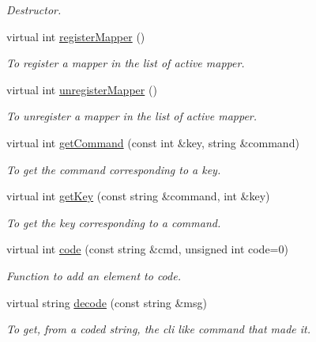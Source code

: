 \begin{DoxyCompactItemize}
\begin{DoxyCompactList}\small\item\em Destructor. \item\end{DoxyCompactList}\item 
virtual int \hyperlink{classUMSMapper_a39acbc8e93c31d005a3a676ce9ec5e4c}{registerMapper} ()
\begin{DoxyCompactList}\small\item\em To register a mapper in the list of active mapper. \item\end{DoxyCompactList}\item 
virtual int \hyperlink{classUMSMapper_ae825ecd7039b09d7ddd74be5e2236628}{unregisterMapper} ()
\begin{DoxyCompactList}\small\item\em To unregister a mapper in the list of active mapper. \item\end{DoxyCompactList}\item 
virtual int \hyperlink{classUMSMapper_abf93114fd8a822d7d1b342686e2d32f9}{getCommand} (const int \&key, string \&command)
\begin{DoxyCompactList}\small\item\em To get the command corresponding to a key. \item\end{DoxyCompactList}\item 
virtual int \hyperlink{classUMSMapper_a1a8e2189e1770c426387e391dc75dce9}{getKey} (const string \&command, int \&key)
\begin{DoxyCompactList}\small\item\em To get the key corresponding to a command. \item\end{DoxyCompactList}\item 
virtual int \hyperlink{classUMSMapper_af5aec06e19b9b242645cf1abc2d6dad0}{code} (const string \&cmd, unsigned int code=0)
\begin{DoxyCompactList}\small\item\em Function to add an element to code. \item\end{DoxyCompactList}\item 
virtual string \hyperlink{classUMSMapper_a09302a31b4cc2698d0e0d563988fb7c3}{decode} (const string \&msg)
\begin{DoxyCompactList}\small\item\em To get, from a coded string, the cli like command that made it. \item\end{DoxyCompactList}\end{DoxyCompactItemize}
